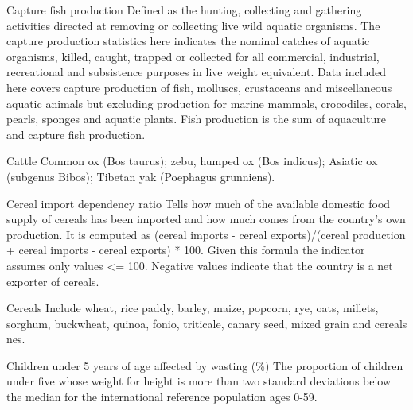 \begin{MetadataCollection} {}
\begin{metadata}{Capture fish production} {}
Defined as the hunting, collecting and gathering activities directed at removing or collecting live wild aquatic organisms. The capture production statistics here indicates the nominal catches of aquatic organisms, killed, caught, trapped or collected for all commercial, industrial, recreational and subsistence purposes in live weight equivalent. Data included here covers capture production of fish, molluscs, crustaceans and miscellaneous aquatic animals but excluding production for marine mammals, crocodiles, corals, pearls, sponges and aquatic plants. Fish production is the sum of aquaculture and capture fish production.
\end{metadata}

\begin{metadata}{Cattle} {}
Common ox (Bos taurus); zebu, humped ox (Bos indicus); Asiatic ox (subgenus Bibos); Tibetan yak (Poephagus grunniens).
\end{metadata}

\begin{metadata}{Cereal import dependency ratio} {}
Tells how much of the available domestic food supply of cereals has been imported and how much comes from the country's own production. It is computed as (cereal imports - cereal exports)/(cereal production + cereal imports - cereal exports) * 100. Given this formula the indicator assumes only values <= 100. Negative values indicate that the country is a net exporter of cereals.
\end{metadata}

\begin{metadata}{Cereals} {}
Include wheat, rice paddy, barley, maize, popcorn, rye, oats, millets, sorghum, buckwheat, quinoa, fonio, triticale, canary seed, mixed grain and cereals nes.
\end{metadata}

\begin{metadata}{Children under 5 years of age affected by wasting (\%)} {}
The proportion of children under five whose weight for height is more than two standard deviations below the median for the international reference population ages 0-59.
\end{metadata}


\end{MetadataCollection}
